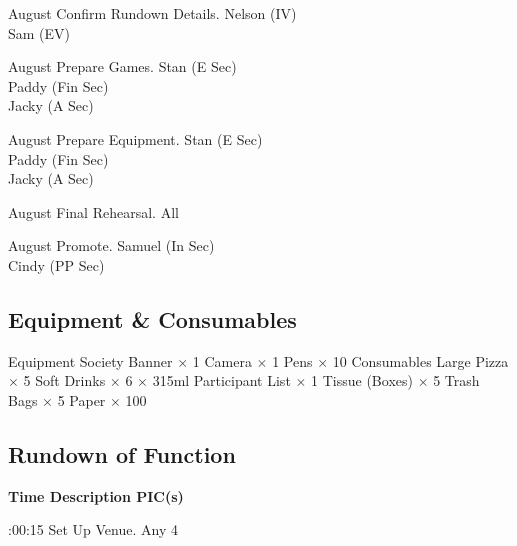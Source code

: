 \bTR{}
\eTD{} August
\eTD\bTD Confirm Rundown Details.
\eTD\bTD Nelson (IV) \\ Sam (EV)
\eTD\eTR

\bTR{}
\eTD{} August
\eTD\bTD Prepare Games.
\eTD\bTD Stan (E Sec) \\ Paddy (Fin Sec) \\ Jacky (A Sec)
\eTD\eTR

\bTR{}
\eTD{} August
\eTD\bTD Prepare Equipment.
\eTD\bTD Stan (E Sec) \\ Paddy (Fin Sec) \\ Jacky (A Sec)
\eTD\eTR

\bTR{}
\eTD{} August
\eTD\bTD Final Rehearsal.
\eTD\bTD All
\eTD\eTR

\bTR{}
\eTD{} August
\eTD\bTD Promote.
\eTD\bTD Samuel (In Sec) \\ Cindy (PP Sec)
\eTD\eTR

\eTABLEbody
\eTABLE

\subsection{Equipment \& Consumables}
\starttabulate[|l|l|]
\NC{}Equipment\NC\NR
\HL
\NC Society Banner          \NC $\times$ 1  \NR
\NC Camera                  \NC $\times$ 1  \NR
\NC Pens                    \NC $\times$ 10 \NR
\HL
\NR
\NC{}Consumables\NC\NR
\HL
\NC Large Pizza             \NC $\times$ 5      \NR
\NC Soft Drinks              $\times$ 6 $\times$ 315ml \NR
\NC Participant List        \NC $\times$ 1      \NR
\NC Tissue (Boxes)          \NC $\times$ 5      \NR
\NC Trash Bags              \NC $\times$ 5      \NR
\NC Paper                   \NC $\times$ 100    \NR
\HL
\stoptabulate

\subsection{Rundown of Function}

\setupTABLE[c][1][width=1.25in]
\setupTABLE[c][2][width=3.5in]
\setupTABLE[c][3][width=1.25in]
\bTABLE
\bTABLEhead

\bTR\bTH    \bf{Time}
\eTH\bTH    \bf{Description}
\eTH\bTH    \bf{PIC(s)}
\eTH\eTR

\eTABLEhead
\bTABLEbody

\bTR{}:00:15
\eTD\bTD Set Up Venue.
\eTD\bTD Any 4
\eTD\eTR


